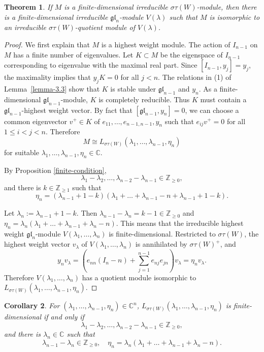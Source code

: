\documentclass[12pt,a4paper]{amsart}
\newtheorem{theorem}{Theorem}[section]
\newtheorem{corollary}[theorem]{Corollary}%
\numberwithin{equation}{section}
\newcommand{\C}{\mathbb C}
\newcommand{\Z}{\mathbb{Z}}
\def\gl{\mathfrak{gl}}
\def\l{\lambda}
\begin{document}
\begin{theorem}\label{finite-1}If $M$ is a finite-dimensional irreducible  $\sigma\tau(W)$-module, then there is a finite-dimensional irreducible $\gl_n$-module $V(\l)$ such that $M$ is isomorphic to an irreducible $\sigma\tau(W)$-quotient module
of  $V(\l)$.
\end{theorem}
\begin{proof}
We first explain  that $M$ is a highest weight module. The  action of
$I_{n-1}$ on $M$ has a finite number of eigenvalues.
Let $K\subset M$ be the eigenspace of $I_{n-1}$ corresponding to
eigenvalue with the maximal real part.
Since  $[I_{n-1},y_j]=y_j$, the maximality implies that $y_j K=0$
for all $j<n$.
 The relations in (1) of 
Lemma~\ref{lemma-3.3} show that $K$ is stable under $\gl_{n-1}$ and $y_n$. As a
finite-dimensional $\gl_{n-1}$-module, $K$ is completely reducible. Thus  $K$ must contain
a $\gl_{n-1}$-highest weight vector. By
fact that $[\gl_{n-1},y_n]=0$, we can choose a common eigenvector $v^+\in K$
of $e_{11},\dots,e_{n-1,n-1}, y_n$ such that $e_{ij}v^+=0$
for all $1\leq i<j<n$.
Therefore
\[
 M\cong L_{\sigma\tau(W)}(\l_1,\dots,\l_{n-1},\eta_n)
\]
for suitable $\l_1,\dots,\l_{n-1},\eta_n\in\C$.

By Proposition \ref{finite-condition},
$$\l_1-\l_2,\dots,\l_{n-2}-\l_{n-1}\in \Z_{\geq 0},$$
and there is  $k\in \Z_{\geq 1}$
such that
\begin{equation}\label{equation-l}\eta_n=
(\l_{n-1}+1-k)(\l_1+\dots+\l_{n-1}-n+\l_{n-1}+1-k).\end{equation}

Let $\l_n:=\l_{n-1}+1-k$. Then $\l_{n-1}-\l_n=k-1\in \Z_{\geq 0} $ and
$\eta_n=\l_n(\l_1+\dots+\l_{n-1}+\l_n-n)$.
This means that the  irreducible highest weight $\gl_n$-module $V(\l_1,\dots,\l_{n})$ is finite-dimensional. Restricted to $\sigma\tau(W)$,
the highest weight vector $v_\l$ of $V(\l_1,\dots,\l_{n})$ is annihilated by
$\sigma\tau(W)^+$, and
$$y_nv_{\l}=
(e_{nn}(I_{n}-n)
+\sum_{j=1}^{n-1} e_{nj}e_{jn} ) v_{\l}=
\eta_n v_{\l}.$$
Therefore $V(\l_1,\dots,\l_{n})$
 has a quotient module  isomorphic to $L_{\sigma\tau(W)}(\l_1,\dots,\l_{n-1},\eta_n)$.
\end{proof}

\begin{corollary}For $(\l_1,\dots,\l_{n-1},\eta_n)\in \C^{n}$,   $L_{\sigma\tau(W)}(\l_1,\dots,\l_{n-1},\eta_n)$ is finite-dimensional if and only if
$$\l_1-\l_2,\dots,\l_{n-2}-\l_{n-1}\in \Z_{\geq 0},$$
and  there is  $\l_n\in \C$
such that
$$
\l_{n-1}-\l_n\in \Z_{\geq 0}, \quad
\eta_n=
\l_n(\l_1+\dots+\l_{n-1}+\l_n-n).$$
\end{corollary}
\end{document}

